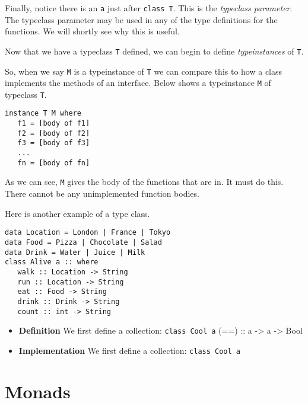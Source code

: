 Finally, notice there is an \lstinline{a} just after \lstinline{class T}. 
This is the \textit{typeclass parameter}. The typeclass parameter may be used in any of the 
type definitions for the functions. We will shortly see why this is useful. 

Now that we have a typeclass \lstinline{T} defined, we can begin to define 
\textit{typeinstances} of \lstinline{T}. 


So, when we say \lstinline{M} is a typeinstance of \lstinline{T} 
we can compare this to how a class implements the methods of an interface. 
Below shows a typeinstance \lstinline{M} of typeclass \lstinline{T}.

\begin{lstlisting}
instance T M where
   f1 = [body of f1]
   f2 = [body of f2]
   f3 = [body of f3]
   ...
   fn = [body of fn]
\end{lstlisting}

As we can see, \lstinline{M} gives the body of the functions that are in. 
It must do this. There cannot be any unimplemented function bodies.   



Here is another example of a type class. 
\begin{lstlisting}
data Location = London | France | Tokyo
data Food = Pizza | Chocolate | Salad
data Drink = Water | Juice | Milk
class Alive a :: where
   walk :: Location -> String
   run :: Location -> String
   eat :: Food -> String
   drink :: Drink -> String
   count :: int -> String
\end{lstlisting}



\begin{itemize}	
\renewcommand{\labelitemi}{$\Box$}
\item \textbf{Definition} We first define a collection:
\lstinline{class Cool a}
(==)                  :: a -> a -> Bool
\item \textbf{Implementation} We first define a collection:
\lstinline{class Cool a}

\end{itemize}




\chapter{Monads}



